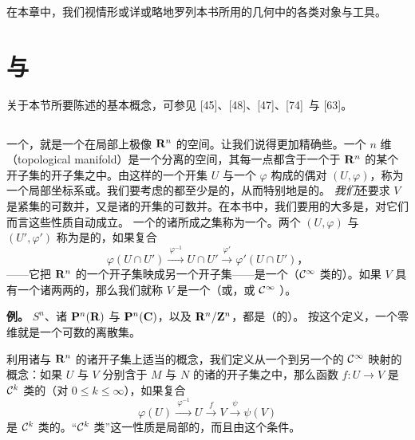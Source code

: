 
在本章中，我们视情形或详或略地罗列本书所用的\trDifferential{}几何中的各类对象与工具。

\section{\trManifold{}与\trSubmanifold}
\label{sec:manifolds-submanifolds}

关于本节所要陈述的基本概念，可参见 [45]、[48]、[47]、[74]~与 [63]。

\subsection{\trManifold}
\label{subsec:manifolds}

一个\trManifold，就是一个在局部上极像 $\mathbf{R}^{n}$ 的空间。让我们说得更加精确些。一个 $n$ 维\textbf{\trTopology\trManifold}（topological manifold）是一个分离的\trTopology{}空间，其每一点都含于一个\trHomeomorphism{}于 $\mathbf{R}^{n}$ 的某个开子集的开子集之中。由这样的一个开集 $U$ 与一个\trHomeomorphism{} $\varphi$ 构成的偶对 $(U,\varphi)$，称为一个局部坐标系或\trChart。我们要考虑的\trManifold{}都至少是\trParacompact{}的，从而特别地是\trSeparable{}的。
\emph{我们}还要求 $V$ 是紧集的可数并，又是诸\trChart{}的开集的可数并。在本书中，我们要用的大多是\trCompact\trManifold，对它们而言这些性质自动成立。
一个\trManifold{}的诸\trChart{}所成之集称为一个\trAtlas。两个\trChart{} $(U,\varphi)$ 与 $(U',\varphi')$ 称为是\trCompatible{}的，如果复合
\[
\varphi(U\cap U')\xrightarrow{\ \varphi^{-1}\ }U\cap U'\xrightarrow{\ \varphi'\ }\varphi'(U\cap U')\text{，}
\]
——它把 $\mathbf{R}^{n}$ 的一个开子集映成另一个开子集——是一个（$\mathcal{C}^{\infty}$ 类的）\trDiffeomorphism。如果\trManifold{} $V$ 具有一个诸\trChart{}两两\trCompatible{}的\trAtlas，那么我们就称 $V$ 是一个\trDifferential\trManifold（或\trSmooth\trManifold，或 $\mathcal{C}^{\infty}$ \trManifold）。

\noindent\textbf{例。}\trSphere{} $S^{n}$、诸\trProjectiveSpace{} $\mathbf{P}^{n}(\mathbf{R})$ 与 $\mathbf{P}^{n}(\mathbf{C})$，以及\trTorus{} $\mathbf{R}^{n}/\mathbf{Z}^{n}$，都是（\trSmooth{}的）\trManifold。
按这个定义，一个零维\trManifold{}就是一个可数的离散集。

利用诸\trChart{}与 $\mathbf{R}^{n}$ 的诸开子集上适当的概念，我们定义从一个\trManifold{}到另一个\trManifold{}的 $\mathcal{C}^{\infty}$ 映射的概念：如果 $U$ 与 $V$ 分别含于\trManifold{} $M$ 与 $N$ 的诸\trChart{}的开子集之中，那么函数 $f:U\to V$ 是 $\mathcal{C}^{k}$ 类的（对 $0\le k\le\infty$），如果复合
\[
\varphi(U)\xrightarrow{\ \varphi^{-1}\ }U\xrightarrow{\ f\ }V\xrightarrow{\ \psi\ }\psi(V)
\]
是 $\mathcal{C}^{k}$ 类的。“$\mathcal{C}^{k}$ 类”这一性质是局部的，而且由这个条件\trWellDefined。


